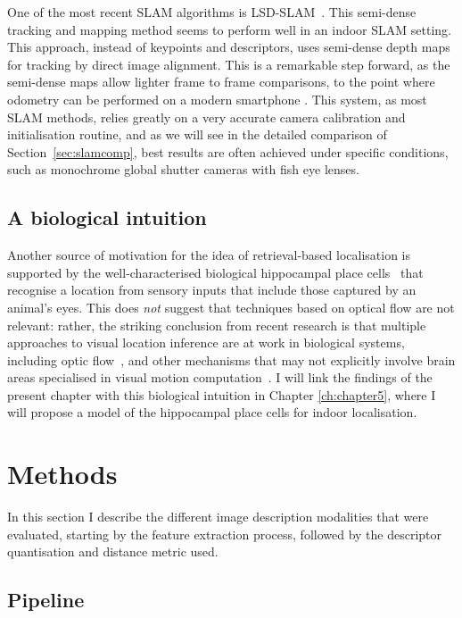 One of the most recent SLAM algorithms is LSD-SLAM~\citep{engel14eccv}. This semi-dense tracking and mapping method seems to perform well in an indoor SLAM setting. This approach, instead of keypoints and descriptors, uses semi-dense depth maps for tracking by direct image alignment. This is a remarkable step forward, as the semi-dense maps allow lighter frame to frame comparisons, to the point where odometry can be performed on a modern smartphone \citep{schoeps14ismar}. This system, as most SLAM methods, relies greatly on a very accurate camera calibration and initialisation routine, and as we will see in the detailed comparison of Section~\ref{sec:slamcomp}, best results are often achieved under specific conditions, such as monochrome global shutter cameras with fish eye lenses.

\subsection{A biological intuition}

Another source of motivation for the idea of retrieval-based localisation is supported by the well-characterised biological hippocampal place cells~\cite{burgess2002human} that recognise a location from sensory inputs that include those captured by an animal's eyes. This does  \textit{not} suggest that techniques based on optical flow are not relevant: rather, the striking conclusion from recent research is that multiple approaches to visual location inference are at work in biological systems, including optic flow~\cite{Layton2014}, and other mechanisms that may not explicitly involve brain areas specialised in visual motion computation~\cite{hartley2014space}. I will link the findings of the present chapter with this biological intuition in Chapter \ref{ch:chapter5}, where I will propose a model of the hippocampal place cells for indoor localisation.


\section{Methods}
\label{sec:methods}

In this section I describe the different image description modalities that were evaluated, starting by the feature extraction process, followed by the descriptor quantisation and distance metric used.

\subsection{Pipeline}

